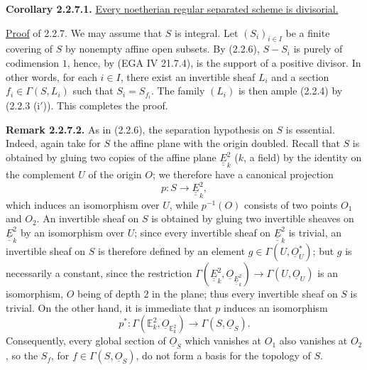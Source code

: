 \textbf{Corollary 2.2.7.1.} \uline{Every noetherian regular separated scheme is divisorial.}

\uline{Proof} of 2.2.7. We may assume that $S$ is integral. Let $(S_i)_{i\in I}$ be a finite covering of $S$ by nonempty affine open subsets. By (2.2.6), $S-S_i$ is purely of codimension $1$, hence, by (EGA IV 21.7.4), is the support of a positive divisor. In other words, for each $i\in I$, there exist an invertible sheaf $L_i$ and a section $f_i\in\Gamma(S,L_i)$ such that $S_i=S_{f_i}$. The family $(L_i)$ is then ample (2.2.4) by (2.2.3 (i$'$)). This completes the proof.

\textbf{Remark 2.2.7.2.} As in (2.2.6), the separation hypothesis on $S$ is essential. Indeed, again take for $S$ the affine plane with the origin doubled. Recall that $S$ is obtained by gluing two copies of the affine plane $\underline{\underline{E}}^2_k$ ($k$, a field) by the identity on the complement $U$ of the origin $O$; we therefore have a canonical projection
\[
p:S\longrightarrow\underline{\underline{E}}^2_k,
\]
which induces an isomorphism over $U$, while $p^{-1}(O)$ consists of two points $O_1$ and $O_2$. An invertible sheaf on $S$ is obtained by gluing two invertible sheaves on $\underline{\underline{E}}^2_k$ by an isomorphism over $U$; since every invertible sheaf on $\underline{\underline{E}}^2_k$ is trivial, an invertible sheaf on $S$ is therefore defined by an element $g\in\Gamma(U,\underline{O}_U^*)$; but $g$ is necessarily a constant, since the restriction $\Gamma(\underline{\underline{E}}^2_k,\underline{O}_{\underline{\underline{E}}^2_k})\to\Gamma(U,\underline{O}_U)$ is an isomorphism, $O$ being of depth $2$ in the plane; thus every
%
invertible sheaf on $S$ is trivial. On the other hand, it is immediate that $p$ induces an isomorphism
\[
p^*:\Gamma(\mathbb E^2_k,\underline{O}_{\mathbb E^2_k})\longrightarrow\Gamma(S,\underline{O}_S).
\]
Consequently, every global section of $\underline{O}_S$ which vanishes at $O_1$ also vanishes at $O_2$, so the $S_f$, for $f\in\Gamma(S,\underline{O}_S)$, do not form a basis for the topology of $S$.

